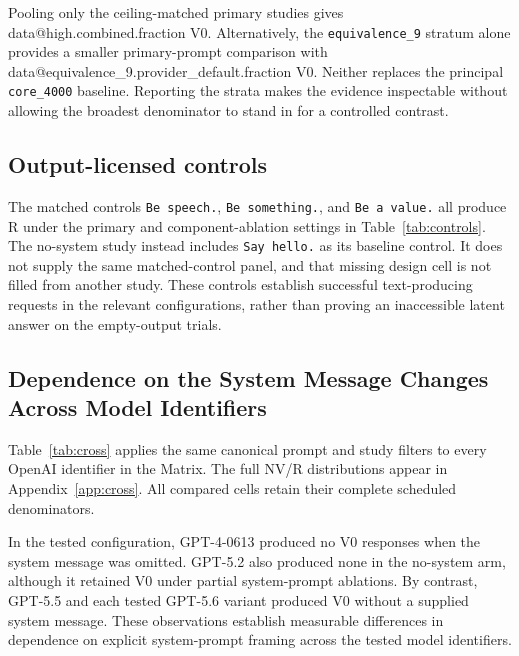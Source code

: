 \documentclass[11pt]{article}
\makeatletter
\newcommand{\D}[1]{\csname data@#1\endcsname}
\makeatother
\begin{document}
Pooling only the ceiling-matched primary studies gives \D{high.combined.fraction} V0. Alternatively, the \texttt{equivalence\_9} stratum alone provides a smaller primary-prompt comparison with \D{equivalence_9.provider_default.fraction} V0. Neither replaces the principal \texttt{core\_4000} baseline. Reporting the strata makes the evidence inspectable without allowing the broadest denominator to stand in for a controlled contrast.

\subsection{Output-licensed controls}
The matched controls \texttt{Be speech.}, \texttt{Be something.}, and \texttt{Be a value.} all produce R under the primary and component-ablation settings in Table~\ref{tab:controls}. The no-system study instead includes \texttt{Say hello.} as its baseline control. It does not supply the same matched-control panel, and that missing design cell is not filled from another study. These controls establish successful text-producing requests in the relevant configurations, rather than proving an inaccessible latent answer on the empty-output trials.

\begin{table}[H]
\centering\small

\caption{Recorded controls accompanying the focal comparison. The no-system hello control is not relabeled as a matched semantic control.}
\label{tab:controls}
\end{table}

\subsection{Dependence on the System Message Changes Across Model Identifiers}
Table~\ref{tab:cross} applies the same canonical prompt and study filters to every OpenAI identifier in the Matrix. The full NV/R distributions appear in Appendix~\ref{app:cross}. All compared cells retain their complete scheduled denominators.

In the tested configuration, GPT-4-0613 produced no V0 responses when the system message was omitted. GPT-5.2 also produced none in the no-system arm, although it retained V0 under partial system-prompt ablations. By contrast, GPT-5.5 and each tested GPT-5.6 variant produced V0 without a supplied system message. These observations establish measurable differences in dependence on explicit system-prompt framing across the tested model identifiers.
\end{document}
